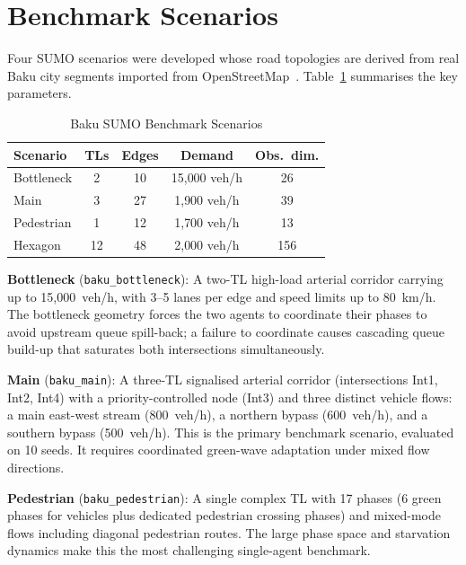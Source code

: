 \documentclass[12pt,oneside,a4paper]{report}
\begin{document}
\section{Benchmark Scenarios}
\label{sec:scenarios_ch3}

Four SUMO scenarios were developed whose road topologies are derived
from real Baku city segments imported from OpenStreetMap~\cite{openstreetmap2008}.
Table~\ref{tab:scenarios} summarises the key parameters.

\begin{table}[H]
\centering
\caption{Baku SUMO Benchmark Scenarios}
\label{tab:scenarios}
\begin{tabular}{lcccc}
\toprule
\textbf{Scenario} & \textbf{TLs} & \textbf{Edges} &
  \textbf{Demand} & \textbf{Obs.\ dim.}\\
\midrule
Bottleneck   & 2  & 10 & 15{,}000 veh/h & 26  \\
Main         & 3  & 27 & 1{,}900 veh/h  & 39  \\
Pedestrian   & 1  & 12 & 1{,}700 veh/h  & 13  \\
Hexagon      & 12 & 48 & 2{,}000 veh/h  & 156 \\
\bottomrule
\end{tabular}
\end{table}

\textbf{Bottleneck} (\texttt{baku\_bottleneck}): A two-TL
high-load arterial corridor carrying up to 15{,}000~veh/h, with
3--5 lanes per edge and speed limits up to 80~km/h.  The bottleneck
geometry forces the two agents to coordinate their phases to avoid
upstream queue spill-back; a failure to coordinate causes cascading
queue build-up that saturates both intersections simultaneously.

\textbf{Main} (\texttt{baku\_main}): A three-TL signalised
arterial corridor (intersections Int1, Int2, Int4) with a
priority-controlled node (Int3) and three distinct vehicle flows:
a main east-west stream (800~veh/h), a northern bypass (600~veh/h),
and a southern bypass (500~veh/h).  This is the primary benchmark
scenario, evaluated on 10 seeds.  It requires coordinated
green-wave adaptation under mixed flow directions.

\textbf{Pedestrian} (\texttt{baku\_pedestrian}): A single complex
TL with 17 phases (6 green phases for vehicles plus dedicated
pedestrian crossing phases) and mixed-mode flows including diagonal
pedestrian routes.  The large phase space and starvation dynamics
make this the most challenging single-agent benchmark.
\end{document}

